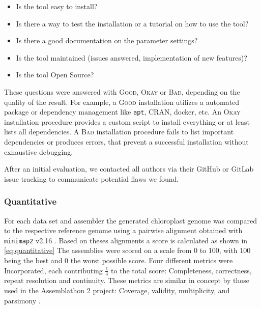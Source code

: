 \documentclass{bmcart}
\newcommand{\ok}{\textsc{Okay}}
\newcommand{\bad}{\textsc{Bad}}
\newcommand{\good}{\textsc{Good}}
\begin{document}
\begin{itemize}
    \item Is the tool easy to install? 
    \item Is there a way to test the installation or a tutorial on how to use the tool? 
    \item Is there a good documentation on the parameter settings? 
    \item Is the tool maintained (issues answered, implementation of new features)? 
    \item Is the tool Open Source?
\end{itemize}
\newline
These questions were answered with \good{}, \ok{} or \bad{}, depending on the quality of the result. 
For example, a \good{} installation utilizes a automated package or dependency management like \texttt{apt},
CRAN, docker, etc. An \ok{} installation procedure provides a custom script to install everything or at least lists all dependencies. A \bad{} installation procedure fails to list important dependencies or produces errors, that prevent a successful installation without exhaustive debugging.

After an initial evaluation, we contacted all authors via their GitHub or GitLab issue tracking to communicate potential flaws we found.

\subsubsection*{Quantitative}

%



For each data set and assembler the generated chloroplast genome was compared to the respective reference genome using a pairwise alignment obtained with \texttt{minimap2} v2.16 \cite{li2018minimap2}. Based on theses alignments a score is calculated as shown in \cref{eq:quantitative}
The assemblies were scored on a scale from 0 to 100, with 100 being the best and 0 the worst possible score. Four different metrics were Incorporated, each contributing  $\frac{1}{4}$ to the total score: Completeness, correctness, repeat resolution and continuity.
These metrics are similar in concept by those used in the Assemblathon 2 project: Coverage, validity, multiplicity, and parsimony \cite{assemblathon2}.
\end{document}
